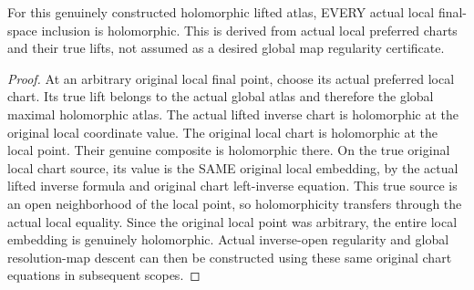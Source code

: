 \begin{theorem}
\label{hir:terminal-atlas-actual-local-inclusion-holomorphic}
\leanok
{}
For this genuinely constructed holomorphic lifted atlas, EVERY actual
local final-space inclusion is holomorphic. This is derived from actual
local preferred charts and their true lifts, not assumed as a desired
global map regularity certificate.
\end{theorem}
\begin{proof}
At an arbitrary original local final point, choose its actual preferred
local chart. Its true lift belongs to the actual global atlas and therefore
the global maximal holomorphic atlas. The actual lifted inverse chart is
holomorphic at the original local coordinate value. The original local
chart is holomorphic at the local point. Their genuine composite is
holomorphic there. On the true original local chart source, its value is
the SAME original local embedding, by the actual lifted inverse formula
and original chart left-inverse equation. This true source is an open
neighborhood of the local point, so holomorphicity transfers through the
actual local equality. Since the original local point was arbitrary,
the entire local embedding is genuinely holomorphic. Actual inverse-open
regularity and global resolution-map descent can then be constructed
using these same original chart equations in subsequent scopes.
\end{proof}

